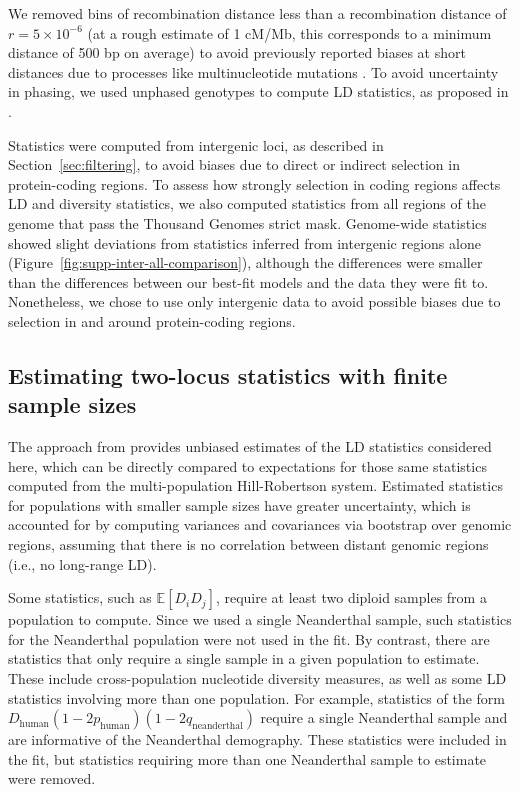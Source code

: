 \documentclass[]{article}
\newcommand{\E}{\mathbb{E}}
\begin{document}
We removed bins of recombination distance less than a recombination distance of
$r = 5\times10^{-6}$ (at a rough estimate of 1 cM/Mb, this corresponds to a minimum
distance of 500 bp on average) to avoid previously reported biases at short
distances due to processes like multinucleotide mutations
\citep{Harris2014-zg,Ragsdale2019-nt}. To avoid uncertainty in phasing, we used
unphased genotypes to compute LD statistics, as proposed in
\citet{Ragsdale2020-nz}. 

Statistics were computed from intergenic loci, as described in
Section~\ref{sec:filtering}, to avoid biases due to direct or indirect
selection in protein-coding regions. To assess how strongly selection in coding
regions affects LD and diversity statistics, we also computed statistics from
all regions of the genome that pass the Thousand Genomes strict mask.
Genome-wide statistics showed slight deviations from statistics inferred from
intergenic regions alone (Figure~\ref{fig:supp-inter-all-comparison}), although
the differences were smaller than the differences between our best-fit models
and the data they were fit to. Nonetheless, we chose to use only intergenic
data to avoid possible biases due to selection in and around protein-coding
regions.

\subsection{Estimating two-locus statistics with finite sample sizes}

The approach from \citet{Ragsdale2020-nz} provides unbiased estimates of the LD
statistics considered here, which can be directly compared to expectations for
those same statistics computed from the multi-population Hill-Robertson system.
Estimated statistics for populations with smaller sample sizes have greater
uncertainty, which is accounted for by computing variances and covariances via
bootstrap over genomic regions, assuming that there is no correlation between
distant genomic regions (i.e., no long-range LD).

Some statistics, such as $\E[D_i D_j]$, require at least two diploid samples
from a population to compute. Since we used a single Neanderthal sample, such
statistics for the Neanderthal population were not used in the fit. By contrast,
there are statistics that only require a single sample in a given population to
estimate. These include cross-population nucleotide diversity measures, as well
as some LD statistics involving more than one population. For example,
statistics of the form
$D_{\text{human}}(1-2p_{\text{human}})(1-2q_{\text{neanderthal}})$ require a
single Neanderthal sample and are informative of the Neanderthal demography.
These statistics were included in the fit, but statistics requiring more than
one Neanderthal sample to estimate were removed.
\end{document}
